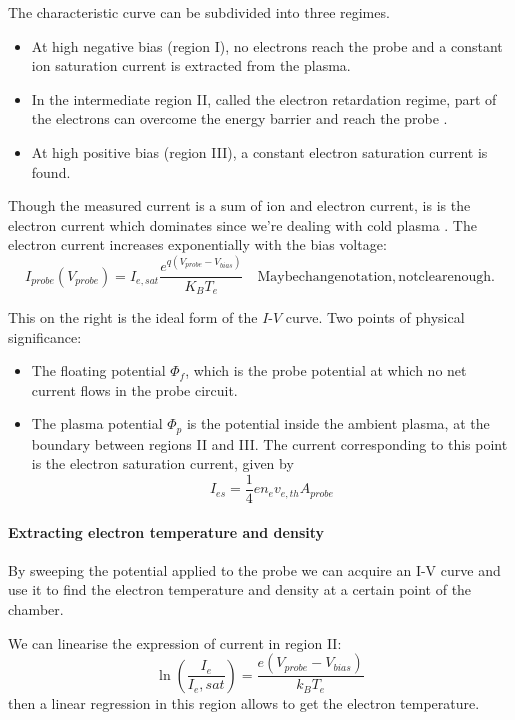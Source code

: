 The characteristic curve can be subdivided into three regimes. 
\begin{itemize}
    \item At high negative bias (region I), no electrons reach the probe and a constant ion saturation current is extracted from the plasma. 
    \item In the intermediate region II, called the electron retardation regime, part of the electrons can overcome the energy barrier and reach the probe \cite{piel_plasma_2017}. 
    \item At high positive bias (region III), a constant electron saturation current is found. 
\end{itemize}
Though the measured current is a sum of ion and electron current, is is the electron current which dominates since we're dealing with cold plasma \cite{sanjines_notice_2014}.
The electron current increases exponentially with the bias voltage:
\begin{equation}
    I_{probe}(V_{probe}) = I_{e,sat} \frac{e^{q(V_{probe} - V_{bias})}}{K_B T_e} \quad \mathrm{Maybe change notation, not clear enough.}
\end{equation}

This on the right is the ideal form of the $I$-$V$ curve.
Two points of physical significance:
\begin{itemize}
    \item The floating potential $\Phi_f$, which is the probe potential at which no net current flows in the probe circuit.
    \item The plasma potential $\Phi_p$ is the potential inside the ambient plasma, at the boundary between regions II and III. The current corresponding to this point is the electron saturation current, given by
    \begin{equation}
        I_{es} = \frac{1}{4}e n_e v_{e,th} A_{probe}
    \end{equation}
\end{itemize}

\paragraph{Extracting electron temperature and density}
By sweeping the potential applied to the probe we can acquire an I-V curve and use it to find the electron temperature and density at a certain point of the chamber.

We can linearise the expression of current in region II:
\begin{equation}
    \ln\left(\frac{I_e}{I_e,sat} \right) = \frac{e(V_{probe} - V_{bias})}{k_B T_e}
\end{equation} 
then a linear regression in this region allows to get the electron temperature.


